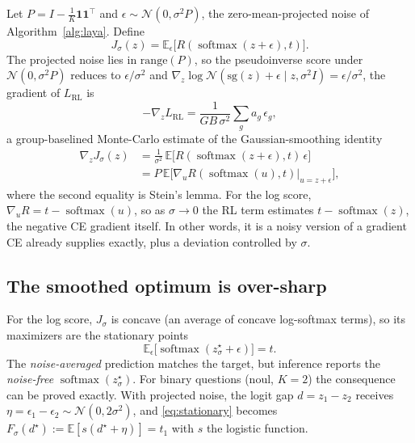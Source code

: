 \documentclass[conference]{IEEEtran}
\DeclareMathOperator{\softmax}{softmax}
\newcommand{\E}{\mathbb{E}}
\newcommand{\N}{\mathcal{N}}
\begin{document}
Let $P=I-\tfrac1K\mathbf{1}\mathbf{1}^\top$ and $\epsilon\sim\N(0,\sigma^2P)$,
the zero-mean-projected noise of Algorithm~\ref{alg:laya}. Define
\begin{equation}
J_\sigma(z)=\E_{\epsilon}\bigl[R(\softmax(z+\epsilon),t)\bigr].
\label{eq:jsigma}
\end{equation}
The projected noise lies in $\mathrm{range}(P)$, so the pseudoinverse score
under $\N(0,\sigma^2P)$ reduces to $\epsilon/\sigma^2$ and
$\nabla_z\log\N(\mathrm{sg}(z)+\epsilon\mid z,\sigma^2 I)=\epsilon/\sigma^2$,
the gradient of $L_\mathrm{RL}$ is
\begin{equation}
-\nabla_z L_\mathrm{RL}=\frac{1}{GB\,\sigma^2}\sum_{g}a_g\,\epsilon_g,
\label{eq:es}
\end{equation}
a group-baselined Monte-Carlo estimate of the Gaussian-smoothing identity~\cite{nesterov2017random,mohamed2020mcgrad}
\begin{equation}
\begin{split}
\nabla_z J_\sigma(z)&=\tfrac{1}{\sigma^2}\,\E\bigl[R(\softmax(z+\epsilon),t)\,\epsilon\bigr]\\
&=P\,\E\bigl[\nabla_u R(\softmax(u),t)\big|_{u=z+\epsilon}\bigr],
\end{split}
\label{eq:stein}
\end{equation}
where the second equality is Stein's lemma. For the log score,
$\nabla_u R=t-\softmax(u)$, so as $\sigma\to0$ the RL term estimates
$t-\softmax(z)$, the negative CE gradient itself. In other words, it is a
noisy version of a gradient CE already supplies exactly, plus a deviation
controlled by $\sigma$.

\subsection{The smoothed optimum is over-sharp}

For the log score, $J_\sigma$ is concave (an average of concave log-softmax
terms), so its maximizers are the stationary points
\begin{equation}
\E_\epsilon\bigl[\softmax(z^\star_\sigma+\epsilon)\bigr]=t .
\label{eq:stationary}
\end{equation}
The \emph{noise-averaged} prediction matches the target, but inference reports
the \emph{noise-free} $\softmax(z^\star_\sigma)$. For binary questions (noul,
$K{=}2$) the consequence can be proved exactly. With projected noise, the
logit gap $d=z_1-z_2$ receives $\eta=\epsilon_1-\epsilon_2\sim\N(0,2\sigma^2)$,
and \eqref{eq:stationary} becomes $F_\sigma(d^\star):=\E[s(d^\star+\eta)]=t_1$
with $s$ the logistic function.
\end{document}
